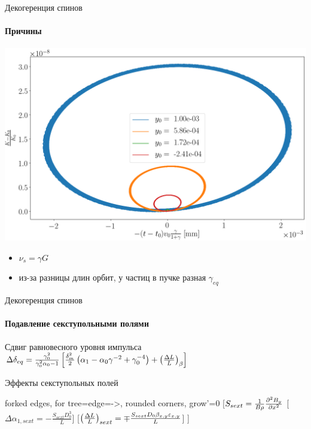 \documentclass[14pt]{beamer}
\begin{document}
\begin{frame}{Декогеренция спинов}
	\framesubtitle{Причины}
	\begin{minipage}{.65\linewidth}
		\includegraphics[width=\linewidth]{chapter1/psp_diagram_betatron}
	\end{minipage}%
	\begin{minipage}{.4\linewidth}
		\begin{itemize}
			\item $\nu_s = \gamma G$
			\item из-за разницы длин орбит, у частиц в пучке разная $\gamma_{eq}$ 
		\end{itemize}
	\end{minipage}
\end{frame}
\begin{frame}{Декогеренция спинов}
	\framesubtitle{Подавление секступольными полями}
	\begin{block}{Сдвиг равновесного уровня импульса}
		$\Delta\delta_{eq} = \frac{\gamma_0^2}{\gamma_0^2\alpha_0 - 1}\bkt*{\frac{\delta_m^2}{2}\bkt{\alpha_1 - \alpha_0\gamma^{-2} + \gamma_0^{-4}} + \bkt{\frac{\Delta L}{L}}_\beta}$
	\end{block}
	\begin{block}{Эффекты секступольных полей}
		\begin{forest}
			forked edges,
			for tree={edge={->},  rounded corners, grow'=0}
			[{$S_{sext} = \frac{1}{B\rho} \pddx{B_y}[x][2]$}
			[{$\Delta \alpha_{1,sext} = -\frac{S_{sext}D_0^3}{L}$}]
			[{$\bkt{\frac{\Delta L}{L}}_{sext} = \mp \frac{S_{sext}D_0\beta_{x,y}\varepsilon_{x,y}}{L}$}]
			]
		\end{forest}
	\end{block}
\end{frame}
\end{document}
